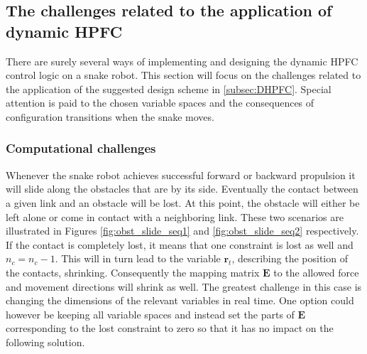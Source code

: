 




\subsection{The challenges related to the application of dynamic HPFC}

There are surely several ways of implementing and designing the dynamic HPFC control logic on a snake robot. This section will focus on the challenges related to the application of the suggested design scheme in \ref{subsec:DHPFC}. Special attention is paid to the chosen variable spaces and the consequences of configuration transitions when the snake moves.

\subsubsection{Computational challenges}

Whenever the snake robot achieves successful forward or backward propulsion it will slide along the obstacles that are by its side. Eventually the contact between a given link and an obstacle will be lost. At this point, the obstacle will either be left alone or come in contact with a neighboring link. These two scenarios are illustrated in Figures \ref{fig:obst_slide_seq1} and \ref{fig:obst_slide_seq2} respectively. If the contact is completely lost, it means that one constraint is lost as well and $n_c = n_c - 1$. This will in turn lead to the variable $\mathbf{r}_t$, describing the position of the contacts, shrinking. Consequently the mapping matrix $\mathbf{E}$ to the allowed force and movement directions will shrink as well. The greatest challenge in this case is changing the dimensions of the relevant variables in real time. One option could however be keeping all variable spaces and instead set the parts of $\mathbf{E}$ corresponding to the lost constraint to zero so that it has no impact on the following solution.

